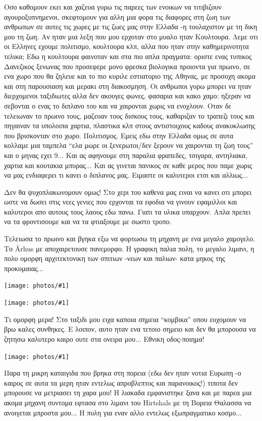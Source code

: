 \documentclass[11pt, letterpaper]{book}
\newcommand\photo[1]{\begin{center}\noindent\texttt{[image: photos/\#1]}\end{center}}
\begin{document}
Οσο καθομουν εκει και χαζευα γυρω τις παρεες των ενοικων να τιτιβιζουν αγουροξυπνημενοι, σκεφτομουν για αλλη μια φορα τις διαφορες στη ζωη των ανθρωπων σε αυτες τις χωρες με τις ζωες μας στην Ελλαδα -η τουλαχιστον με τη δικη μου τη ζωη. 
Αν ηταν μια λεξη που μου ερχοταν στο μυαλο ηταν Κουλτουρα. Λεμε οτι οι Ελληνες εχουμε πολιτισμο, κουλτουρα κλπ, αλλα που ηταν στην καθημερινοτητα τελικα; 
Εδω η κουλτουρα φαινοταν και στα πιο απλα πραγματα: οριστε ενας τυπικος Δανεζικος ξενωνας που προσεφερε μονο φρεσκα βιολογικα προιοντα για πρωινο, σε ενα χωρο που θα ζηλευε και το πιο κυριλε εστιατοριο της Αθηνας, με προσοχη ακομα και στη παρουσιαση και μερακι στη διακοσμηση. 
Οι ανθρωποι γυρω μπορει να ηταν διερχομενοι ταξιδιωτες αλλα δεν ακουγες φωνες, φασαρια και κακο χαμο: ηξεραν να σεβονται ο ενας το διπλανο του και να χαιρονται χωρις να ενοχλουν.
Οταν δε τελειωναν το πρωινο τους, μαζευαν τους δισκους τους, καθαριζαν το τραπεζι τους και πηγαιναν τα υπολοιπα χαρτια, πλαστικα κλπ στους αντιστοιχους καδους ανακυκλωσης που βρισκονταν στο χωρο. Πολιτισμος. 
Εμεις εδω στην Ελλαδα ομως σε αυτα κολλαμε μια ταμπελα ``ελα μωρε οι ξενερωτοι/δεν ξερουν να χαιρονται τη ζωη τους'' και ο μηνας εχει 9... Και ας αφηνουμε στη παραλια φραπεδες, τσιγαρα, αντηλιακα, χαρτια και κουτακια μπυρας... Και ας γινεται πανικος σε καθε μερος που παμε χωρις να μας ενδιαφερει τι κανει ο διπλανος μας. Ειμαστε οι καλυτεροι ετσι και αλλιως...

Δεν θα ψυχοπλακωνομουν ομως! Στο χερι του καθενα μας ειναι να κανει οτι μπορει ωστε να δωσει στις νεες γενιες που ερχονται τα εφοδια να γινουν εφαμιλλοι και καλυτεροι απο αυτους τους λαους εδω πανω. Γιατι τα υλικα υπαρχουν. Απλα πρεπει να τα φροντισουμε και να τα φτιαξουμε με σωστο τροπο. 

Τελειωσα το πρωινο και βγηκα εξω να φορτωσω τη μηχανη με ενα μεγαλο χαμογελο. 
Το Århus με αποχαιρετουσε πανεμορφο. Η γραφικη παλια πολη, το μεγαλο λιμανι, η πολυ ομορφη αρχιτεκτονικη των σπιτιων -νεων και παλιων- κατα μηκος της προκυμαιας...

\photo{140.jpg}
\photo{141.jpg}

Τι ομορφη μερα! Στο ταξιδι μου ειχα καποια σημεια ``κομβικα'' οπου ευχομουν να βρω καλες συνθηκες. Ε λοιπον, αυτο ηταν ενα τετοιο σημειο και δεν θα μπορουσα να ζητησω καλυτερο καιρο ουτε στα ονειρα μου...
Εθνικη οδος-ποιημα!

\photo{142.jpg}

Παρα τη μικρη καταιγιδα που βρηκα στη πορεια (εδω δεν ηταν νοτια Ευρωπη -ο καιρος σε αυτα τα μερη ηταν εντελως απροβλεπτος και παρανοικος!) τιποτα δεν μπορουσε να μετριασει τη χαρα μου! Η λιακαδα εμφανιστηκε ξανα και με παρεα μια ακομα μηχανη συντομα εφτασα στο λιμανι του Hirtshals με τη Βορεια Θαλασσα να ανοιγεται μπροστα μου... Η πυλη για εναν αλλο εντελως εξωπραγματικο κοσμο...
\end{document}
